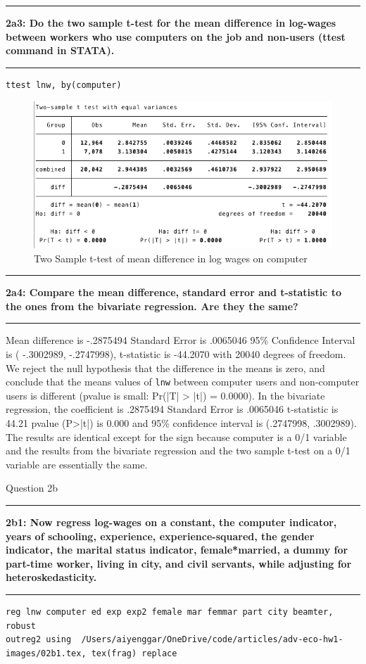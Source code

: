 \documentclass[12pt]{article}
\newcommand\question[2]{\vspace{1em}\hrule\vspace{1em}\textbf{#1: #2}\vspace{1em}\hrule\vspace{1em}}
\begin{document}
\question{2a3}{Do the two sample t-test for the mean difference in log-wages between workers who use computers on the job and non-users (ttest command in STATA). } 
\begin{lstlisting}
ttest lnw, by(computer)
\end{lstlisting}
\begin{figure}[h]
\begin{centering}
  \includegraphics[width=\textwidth]{01-computer-ttest}
  \caption{Two Sample t-test of mean difference in log wages on computer}
   \label{fig:01-computer-ttest}
\end{centering}
\end{figure}

\question{2a4}{Compare the mean difference, standard error and t-statistic to the ones from the bivariate regression.  Are they the same?}
Mean difference is  -.2875494   Standard Error is  .0065046 95\% Confidence Interval is ( -.3002989, -.2747998), t-statistic is  -44.2070 with 20040 degrees of freedom. We reject the null hypothesis that the difference in the means is zero, and conclude that the means values of \verb|lnw| between computer users and non-computer users is different (pvalue is small:  Pr(|T| > |t|) = 0.0000).
In the bivariate regression, the coefficient is  .2875494   Standard Error is .0065046    t-statistic is 44.21   pvalue (P>|t|) is 0.000    and 95\% confidence interval is (.2747998, .3002989). The results are identical except for the sign because computer is a 0/1 variable and the results from the bivariate regression and the two sample t-test on a 0/1 variable are essentially the same.

\begin{center}\LARGE{Question 2b}\end{center}

\question{2b1}{Now regress log-wages on a constant, the computer indicator, years of schooling, experience, experience-squared, the gender indicator, the marital status indicator, female*married, a dummy for part-time worker, living in city, and civil servants, while adjusting for heteroskedasticity.  }
\begin{lstlisting}
reg lnw computer ed exp exp2 female mar femmar part city beamter, robust
outreg2 using  /Users/aiyenggar/OneDrive/code/articles/adv-eco-hw1-images/02b1.tex, tex(frag) replace
\end{lstlisting}

\end{document}
